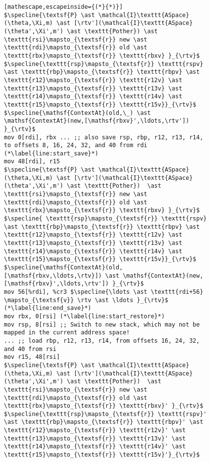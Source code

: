 \begin{figure}\footnotesize
\begin{lstlisting}[mathescape,escapeinside={(*}{*)}]
$\specline{\textsf{P} \ast \mathcal{I}\texttt{ASpace}(\theta,\Xi,m) \ast [\rtv'](\mathcal{I}\texttt{ASpace}(\theta',\Xi',m') \ast \texttt{Pother}) \ast \texttt{rsi}\mapsto_{\textsf{r}} new \ast \texttt{rdi}\mapsto_{\textsf{r}} old \ast \texttt{rbx}\mapsto_{\textsf{r}} \texttt{rbxv} }_{\rtv}$
$\specline{\texttt{rsp}\mapsto_{\textsf{r}} \texttt{rspv} \ast \texttt{rbp}\mapsto_{\textsf{r}} \texttt{rbpv} \ast \texttt{r12}\mapsto_{\textsf{r}} \texttt{r12v} \ast \texttt{r13}\mapsto_{\textsf{r}} \texttt{r13v} \ast \texttt{r14}\mapsto_{\textsf{r}} \texttt{r14v} \ast \texttt{r15}\mapsto_{\textsf{r}} \texttt{r15v}}_{\rtv}$
$\specline{\mathsf{ContextAt}(old,\_) \ast \mathsf{ContextAt}(new,[\mathsf{rbxv}',\ldots,\rtv']) }_{\rtv}$
mov 0[rdi], rbx ... ;; also save rsp, rbp, r12, r13, r14, to offsets 8, 16, 24, 32, and 40 from rdi (*\label{line:start_save}*)
mov 48[rdi], r15
$\specline{\textsf{P} \ast \mathcal{I}\texttt{ASpace}(\theta,\Xi,m) \ast [\rtv'](\mathcal{I}\texttt{ASpace}(\theta',\Xi',m') \ast \texttt{Pother})  \ast  \texttt{rsi}\mapsto_{\textsf{r}} new \ast \texttt{rdi}\mapsto_{\textsf{r}} old \ast \texttt{rbx}\mapsto_{\textsf{r}} \texttt{rbxv} }_{\rtv}$
$\specline{ \texttt{rsp}\mapsto_{\textsf{r}} \texttt{rspv} \ast \texttt{rbp}\mapsto_{\textsf{r}} \texttt{rbpv} \ast \texttt{r12}\mapsto_{\textsf{r}} \texttt{r12v} \ast \texttt{r13}\mapsto_{\textsf{r}} \texttt{r13v} \ast \texttt{r14}\mapsto_{\textsf{r}} \texttt{r14v} \ast \texttt{r15}\mapsto_{\textsf{r}} \texttt{r15v}}_{\rtv}$
$\specline{\mathsf{ContextAt}(old,[\mathsf{rbxv,\ldots,\rtv}]) \ast \mathsf{ContextAt}(new,[\mathsf{rbxv}',\ldots,\rtv']) }_{\rtv}$
mov 56[%rdi], %cr3 $\specline{\ldots \ast \texttt{rdi+56} \mapsto_{\textsf{v}} \rtv \ast \ldots }_{\rtv}$   (*\label{line:end_save}*) 
mov rbx, 0[rsi] (*\label{line:start_restore}*)
mov rsp, 8[rsi] ;; Switch to new stack, which may not be mapped in the current address space!
... ;; load rbp, r12, r13, r14, from offsets 16, 24, 32, and 40 from rsi
mov r15, 48[rsi]
$\specline{\textsf{P} \ast \mathcal{I}\texttt{ASpace}(\theta,\Xi,m) \ast [\rtv'](\mathcal{I}\texttt{ASpace}(\theta',\Xi',m') \ast \texttt{Pother})  \ast  \texttt{rsi}\mapsto_{\textsf{r}} new \ast \texttt{rdi}\mapsto_{\textsf{r}} old \ast \texttt{rbx}\mapsto_{\textsf{r}} \texttt{rbxv}' }_{\rtv}$
$\specline{\texttt{rsp}\mapsto_{\textsf{r}} \texttt{rspv}' \ast \texttt{rbp}\mapsto_{\textsf{r}} \texttt{rbpv}' \ast \texttt{r12}\mapsto_{\textsf{r}} \texttt{r12v}' \ast \texttt{r13}\mapsto_{\textsf{r}} \texttt{r13v}' \ast \texttt{r14}\mapsto_{\textsf{r}} \texttt{r14v}' \ast \texttt{r15}\mapsto_{\textsf{r}} \texttt{r15v}'}_{\rtv}$

\end{lstlisting}
\end{figure}
